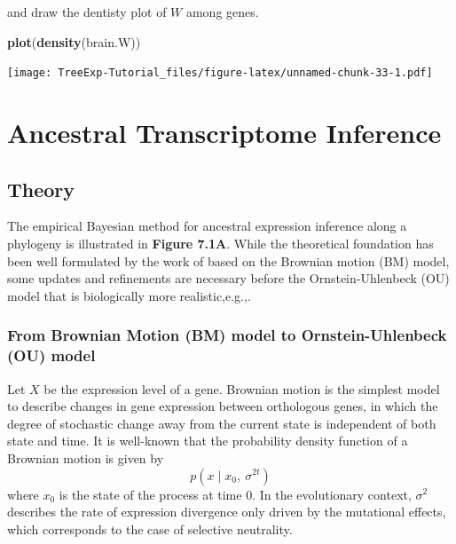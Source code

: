 \documentclass[]{book}
\newenvironment{Shaded}{\begin{snugshade}}{\end{snugshade}}
\newcommand{\KeywordTok}[1]{\textcolor[rgb]{0.13,0.29,0.53}{\textbf{#1}}}
\newcommand{\NormalTok}[1]{#1}
\begin{document}
and draw the dentisty plot of \(W\) among genes.

\begin{Shaded}
\begin{Highlighting}[]
\KeywordTok{plot}\NormalTok{(}\KeywordTok{density}\NormalTok{(brain.W))}
\end{Highlighting}
\end{Shaded}

\texttt{[image: TreeExp-Tutorial\_files/figure-latex/unnamed-chunk-33-1.pdf]}

\hypertarget{ancestral-transcriptome-inference}{%
\chapter{Ancestral Transcriptome Inference}\label{ancestral-transcriptome-inference}}

\hypertarget{theory-3}{%
\section{Theory}\label{theory-3}}

The empirical Bayesian method for ancestral expression inference along a phylogeny is illustrated in \textbf{Figure 7.1A}. While the theoretical foundation has been well formulated by the work of \citep{gu2004} based on the Brownian motion (BM) model, some updates and refinements are necessary before the Ornstein-Uhlenbeck (OU) model that is biologically more realistic,e.g.,\citep{bedford2009}.

\hypertarget{from-brownian-motion-bm-model-to-ornstein-uhlenbeck-ou-model}{%
\subsection{From Brownian Motion (BM) model to Ornstein-Uhlenbeck (OU) model}\label{from-brownian-motion-bm-model-to-ornstein-uhlenbeck-ou-model}}

Let \(X\) be the expression level of a gene. Brownian motion is the simplest model to describe changes in gene expression between orthologous genes, in which the degree of stochastic change away from the current state is independent of both state and time. It is well-known that the probability density function of a Brownian motion is given by
\[p\left(x\mid x_0,\  \sigma^{2t}\right)\tag{4.1}\]
where \(x_0\) is the state of the process at time 0. In the evolutionary context, \(\sigma^{2}\) describes the rate of expression divergence only driven by the mutational effects, which corresponds to the case of selective neutrality.
\end{document}

